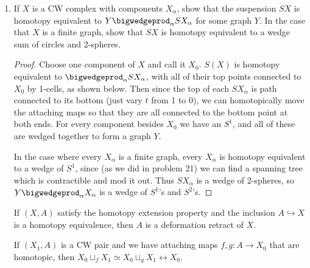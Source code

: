 \documentclass[12pt,letterpaper]{article}
\begin{document}
\begin{enumerate}
\begin{proof}
Therefore 
$$\left ({X*Y}\right )
\simeq
\left (\quotient{X*Y}{(X*\{y_0\}\cup \{x_0\}*Y)}\right )
\simeq
\left (\quotient{S(X\smashprod Y)}{S(\{x_0\}\smashprod\{y_0\})}\right )
\simeq
{S(X\smashprod Y)}
$$
and we are done.
\end{proof}

\item If $X$ is a CW complex with components $X_\alpha$, show that the suspension $SX$ is homotopy equivalent to $Y\bigwedgeprod_\alpha SX_\alpha$ for some graph $Y$. In the case that $X$ is a finite
graph, show that $SX$ is homotopy equivalent to a wedge sum of circles and 2-spheres.
\begin{proof}
Choose one component of $X$ and call it $X_0$. $S(X)$ is homotopy equivalent to $\bigwedgeprod_\alpha SX_\alpha$, with all of their top points connected to $X_0$ by 1-cells, as shown below. Then since the top of each $SX_\alpha$ is path connected to its bottom (just vary $t$ from 1 to 0), we can homotopically move the attaching maps so that they are all connected to the bottom point at both ends. 
For every component besides $X_0$ we have an $S^1$, and all of these are wedged together to form a graph $Y$. 

\pagebreak
In the case where every $X_\alpha$ is a finite graph, every $X_\alpha$ is homotopy equivalent to a wedge of $S^1$, since (as we did in problem 21) we can find a spanning tree which is contractible and mod it out. Thus $SX_\alpha$ is a wedge of 2-spheres, so $Y\bigwedgeprod_\alpha X_\alpha$ is a wedge of $S^1$'s and $S^2$'s. 
\end{proof}

\begin{corollary*}[0.20]
If $(X,A)$ satisfy the homotopy extension property and the inclusion ${A\hookrightarrow X}$ is a homotopy equivalence, then $A$ is a deformation retract of $X$. 
\end{corollary*}

\begin{proposition*}[0.18]
If $(X_1,A)$ is a CW pair and we have attaching maps $f,g:A\to X_0$ that are homotopic, then $X_0\sqcup_fX_1\simeq X_0\sqcup_g X_1 \rel X_0$. 
\end{proposition*}


\end{enumerate}
\end{document}
